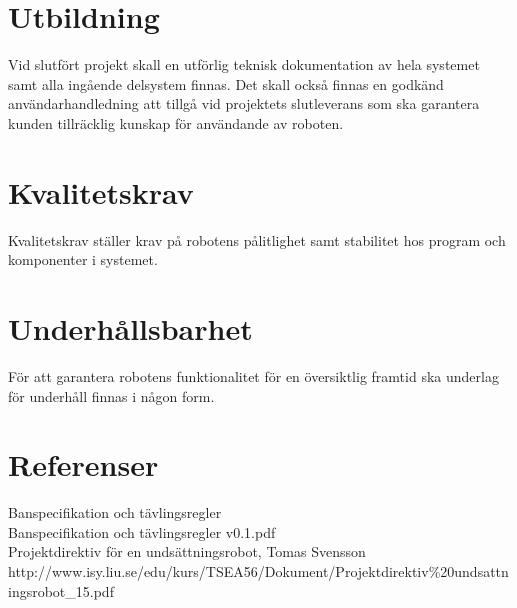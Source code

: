 \documentclass[11pt]{article}
\begin{document}
\begin{flushleft}
\begin{center}
\begin{longtable}{|p{.24\linewidth}|p{.08\linewidth}|p{.25\linewidth}|p{.19\linewidth}|p{.1\linewidth}|}
\end{longtable}
\end{center}

\section{Utbildning}
Vid slutfört projekt skall en utförlig teknisk dokumentation av hela systemet samt alla ingående delsystem finnas. Det skall också finnas en godkänd användarhandledning att tillgå vid projektets slutleverans som ska garantera kunden tillräcklig kunskap för användande av roboten.

\section{Kvalitetskrav}
Kvalitetskrav ställer krav på robotens pålitlighet samt stabilitet hos program och komponenter i systemet.

\section{Underhållsbarhet}
För att garantera robotens funktionalitet för en översiktlig framtid ska underlag för underhåll finnas i någon form.

\setcounter{secnumdepth}{0}
\pagebreak
\section{Referenser}
Banspecifikation och tävlingsregler \\
Banspecifikation och tävlingsregler v0.1.pdf
\\[0.1in]
Projektdirektiv för en undsättningsrobot, Tomas Svensson
http://www.isy.liu.se/edu/kurs/TSEA56/Dokument/Projektdirektiv\%20undsattningsrobot\_15.pdf

\setcounter{secnumdepth}{2}



\end{flushleft}
\end{document}
